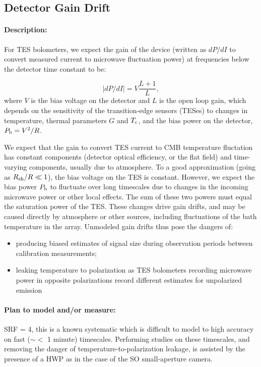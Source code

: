 \subsection{Detector Gain Drift}

\paragraph{Description:}
For TES bolometers, we expect the gain of the device (written as $dP/dI$ to convert measured current to microwave fluctuation power) at frequencies below the detector time constant to be:

\begin{equation}
|dP/dI| = V \frac{L+1}{L},
\label{bolo_gain}
\end{equation}
where $V$ is the bias voltage on the detector and $L$ is the open loop gain, which depends on the sensitivity of the transition-edge sensors (TESes)  to changes in temperature, thermal parameters $G$ and $T_{\mbox{\scriptsize c}}$, and the bias power on the detector, $P_{\mbox{\scriptsize b}} = V^2/R$.

We expect that the gain to convert TES current to CMB temperature fluctation has constant components (detector optical efficiency, or the flat field) and time-varying components, usually due to atmosphere. To a good approximation (going as $R_{\mbox{\scriptsize sh}}/R \ll 1$), the bias voltage on the TES is constant. However, we expect the bias power $P_{\mbox{\scriptsize b}}$ to fluctuate over long timescales due to changes in the incoming microwave power or other local effects. The sum of these two powers must equal the saturation power of the TES. These changes drive gain drifts, and may be caused directly by atmosphere or other sources, including fluctuations of the bath temperature in the array. Unmodeled gain drifts thus pose the dangers of:

\begin{itemize}
\item producing biased estimates of signal size during observation periods between calibration measurements;
\item leaking temperature to polarization as TES bolometers recording microwave power in opposite polarizations record different estimates for unpolarized emission
\end{itemize}

\paragraph{Plan to model and/or measure:}
SRF = 4, this is a known systematic which is difficult to model to high accuracy on fast ($\sim <$ 1 minute) timescales. Performing studies on these timescales, and removing the danger of temperature-to-polarization leakage, is assisted by the presence of a HWP as in the case of the SO small-aperture camera. 

